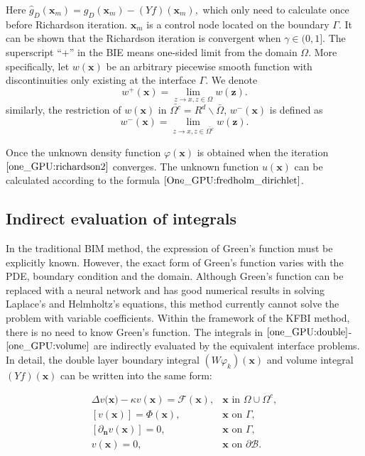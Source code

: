 Here $\hat{g}_{D}(\mathbf{x}_{m}) = g_{D}(\mathbf{x}_{m}) - (Yf)(\mathbf{x}_{m}),$ which only need to calculate once before Richardson iteration. $\mathbf{x}_{m}$ is a control node located on the boundary $\Gamma$. It can be shown that the Richardson iteration is convergent when $\gamma \in (0, 1]$. The superscript ``+'' in the BIE means one-sided limit from the domain $\Omega$. More specifically, let $w(\mathbf{x})$ be an arbitrary piecewise smooth function with discontinuities only existing at the interface $\Gamma$. We denote
 \begin{equation}
     w^{+}(\mathbf{x}) = \lim_{z \longrightarrow x, z \in \Omega} w(\mathbf{z}).
 \end{equation}
similarly, the restriction of $w(\mathbf{x})$ in $\bar{\Omega^{c}} = R^d \backslash \bar{\Omega}$, $w^{-}(\mathbf{x})$ is defined as 
\begin{equation}
    w^{-}(\mathbf{x}) = \lim_{z \longrightarrow x, z \in \bar{\Omega^{c}}} w(\mathbf{z}).
\end{equation}

Once the unknown density function $\varphi(\mathbf{x})$ is obtained when the iteration $\eqref{one_GPU:richardson2}$ converges. The unknown function $u(\mathbf{x})$ can be calculated according to the formula $\eqref{One_GPU:fredholm_dirichlet}$.
\subsection{Indirect evaluation of integrals}\label{introduce_kfbi}
In the traditional BIM method, the expression of Green's function must be explicitly known. However, the exact form of Green's function varies with the PDE, boundary condition and the domain. Although Green's function can be replaced with a neural network\cite{lin2022bigreennet} and has good numerical results in solving Laplace's and Helmholtz's equations, this method currently cannot solve the problem with variable coefficients. Within the framework of the KFBI method, there is no need to know Green's function. The integrals in $\eqref{one_GPU:double}$-$\eqref{one_GPU:volume}$ are indirectly evaluated by the equivalent interface problems. In detail, the double layer boundary integral $(W\varphi_{k})(\mathbf{x})$ and volume integral $(Yf)(\mathbf{x})$ can be written into the same form:

\begin{equation}
    \begin{array}{ll}
        \Delta v(\mathbf{x)} - \kappa v(\mathbf{x})=\mathcal{F}(\mathbf{x}), & \mathbf{x} \text { in } \Omega \cup \Omega^{c}, \\
        {[v(\mathbf{x})]=\Phi(\mathbf{x}),} & \mathbf{x} \text { on } \Gamma, \\
        {\left[\partial_{\mathbf{n}}v(\mathbf{x})\right]=0,} & \mathbf{x}\text { on } \Gamma, \\
        v(\mathbf{x})=0, & \mathbf{x} \text { on } \partial \mathcal{B}.
    \end{array} \label{one_GPU:interface}
\end{equation}

